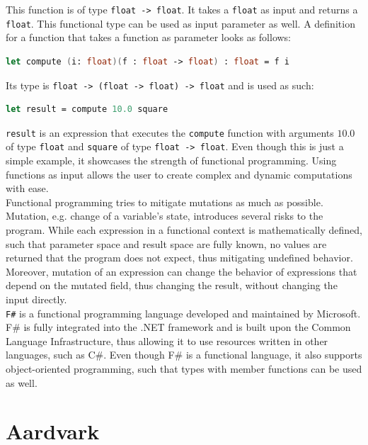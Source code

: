 This function is of type \verb|float -> float|. It takes a \verb|float| as input and returns a \verb|float|. This functional type can be used as input parameter as well. A definition for a function that takes a function as parameter looks as follows: 

\begin{lstlisting}[language=FSharp]
let compute (i: float)(f : float -> float) : float = f i
\end{lstlisting}
Its type is \verb|float -> (float -> float) -> float| and is used as such: 
\begin{lstlisting}[language=FSharp]
let result = compute 10.0 square
\end{lstlisting}

\verb|result| is an expression that executes the \verb|compute| function with arguments $10.0$ of type \verb|float| and \verb|square| of type \verb|float -> float|. Even though this is just a simple example, it showcases the strength of functional programming.  Using functions as input allows the user to create complex and dynamic computations with ease. 
\\

Functional programming tries to mitigate mutations as much as possible. Mutation, e.g. change of a variable's state, introduces several risks to the program. While each expression in a functional context is mathematically defined, such that parameter space and result space are fully known, no values are returned that the program does not expect, thus mitigating undefined behavior. Moreover, mutation of an expression can change the behavior of expressions that depend on the mutated field, thus changing the result, without changing the input directly. 
\\

\verb|F#|\cite{FSharp} is a functional programming language developed and maintained by Microsoft\cite{Microsoft}. F\# is fully integrated into the .NET framework\cite{DotNet} and is built upon the Common Language Infrastructure\cite{CLI}, thus allowing it to use resources written in other languages, such as C\#\cite{CSharp}. Even though F\# is a functional language, it also supports object-oriented programming, such that types with member functions can be used as well. 


\section{Aardvark}
\label{sec:aardvark}

